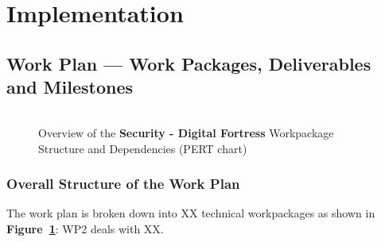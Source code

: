 \documentclass[a4paper,11pt]{article}
\newcommand{\project}[1]{\textbf{#1}\xspace}
\newcommand{\SECURITY}{\project{Security - Digital Fortress}}
\newcommand{\TheProject}{\SECURITY}
\begin{document}
\clearpage
\section{Implementation}

\subsection{Work Plan --- Work Packages, Deliverables and Milestones}
\label{sect:workplan}


\begin{figure}[tp]
\begin{center}
\vspace{-5mm}
\begin{tabular}{ll}
\end{tabular}
\caption{Overview of the \TheProject{} Workpackage Structure and Dependencies (PERT chart)}
\label{fig:wps}
\end{center}
\end{figure}

\subsubsection*{Overall Structure of the Work Plan}

The work plan is broken down into XX technical workpackages as shown
in \textbf{Figure~\ref{fig:wps}}: WP2 deals with XX.



\bigskip\bigskip
\addtocounter{subsubsection}{1}
\fbox{\begin{minipage}{\textwidth}\begin{center}{\Large\bf
        Work package list} %
  \end{center}
  \end{minipage}}

\bigskip\bigskip
\end{document}
